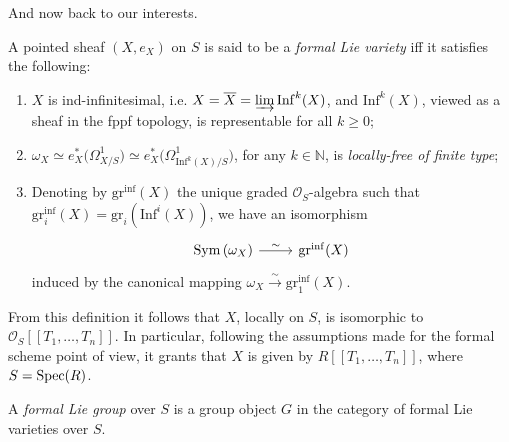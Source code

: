 \noindent
And now back to our interests.
\begin{defn}\label{defn:FormalLieVarfppf}
	A pointed sheaf $\left(X, e_X\right)$ on $S$ is said to be
	a \emph{formal Lie variety} iff it satisfies the following:
\begin{enumerate}
	\item $X$ is ind-infinitesimal,
		i.e$.$ \(X = \overline{X} = \varinjlim \operatorname{Inf}^k(X)\),
		and $\mathrm{Inf}^k(X)$, viewed as a sheaf in
		the fppf topology, is representable for all $k \geq 0$;

	\item $\omega_X \simeq
		e_X^* \big( \Omega_{X/S}^1 \big)
		\simeq e_X^* \big( \Omega^1_{\mathrm{Inf}^k(X)/S} \big)$, for any $k \in \mathbb{N}$,
		is \emph{locally-free of finite type};

	\item Denoting by $\mathrm{gr}^{\mathrm{inf}}(X)$ the unique graded $\mathcal{O}_{ S }$-algebra
		such that $\mathrm{gr}^{\mathrm{inf}}_i(X) = \mathrm{gr}_i(\mathrm{Inf}^i(X))$,
		we have an isomorphism
		\begin{equation*}
		\begin{tikzcd}[row sep = 0ex
			,/tikz/column 1/.append style={anchor=base east}
			,/tikz/column 2/.append style={anchor=base west}]
		\sym\left( \omega_X \right) \arrow[r, "\sim", rightarrow] &
				\mathrm{gr}^{\mathrm{inf}}(X)
		\end{tikzcd}
		\end{equation*}
		induced by the canonical mapping
		$\omega_X \xrightarrow{\sim} \mathrm{gr}_1^{\mathrm{inf}}(X)$.
\end{enumerate}
\end{defn}


\begin{rem}\label{rem:FormalLieVarietyPowerSeries}
	From this definition it follows that $X$, locally on $S$,
	is isomorphic to $\mathcal{O}_S [\![ T_1, \ldots, T_n ]\!]$.
	In particular, following the assumptions made for the formal scheme point of view,
	it grants that $X$ is given by
	$R [\![ T_1, \ldots, T_n ]\!]$,
	where $S = \operatorname{Spec}(R)$.
\end{rem}


\begin{defn}
	A \emph{formal Lie group} over $S$ is a group object $G$
	in the category of formal Lie varieties over $S$.
\end{defn}


